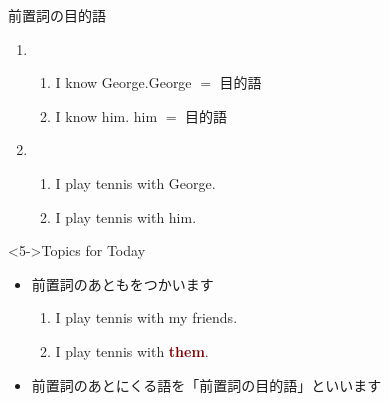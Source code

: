 \documentclass[aspectratio=169,xcolor={dvipsnames,table}]{beamer}
\begin{document}
\begin{frame}[plain]{前置詞の目的語}
 
\begin{enumerate}
 \item<1-> \begin{enumerate}
       \item<1-> I know George.\hfill{\scriptsize George $=$ 目的語}
       \item<2-> I know him. \hfill{\scriptsize him $=$ 目的語}
       \end{enumerate}
 \item<3-> \begin{enumerate}
       \item<3-> I play tennis with George.
	\item<4-> I play tennis with him.\hspace{20pt}
      \end{enumerate}
\end{enumerate}


\begin{block}<5->{Topics for Today}\small
\begin{itemize}[circle]
 \item 前置詞のあともをつかいます
       \begin{enumerate}
	\item I play tennis with my friends.
	\item I play tennis with \textcolor{Maroon}{\textbf{them}}.\hspace{30pt}
       \end{enumerate}
 \item 前置詞のあとにくる語を「前置詞の目的語」といいます
\end{itemize}
     \end{block}
\end{frame}
\end{document}
